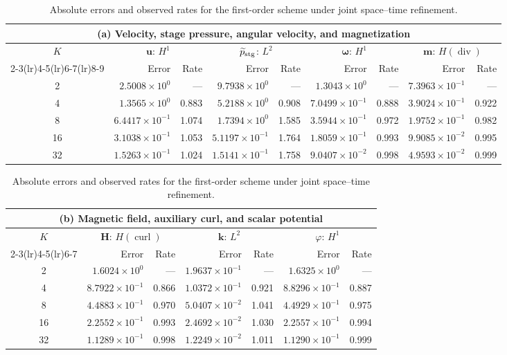 \documentclass[11pt,a4paper]{article}
\newcommand{\bs}{\boldsymbol}
\DeclareMathOperator{\curl}{curl}
\DeclareMathOperator{\ddiv}{div}
\newcommand{\Div}{\ddiv}
\newcommand{\pp}{\widetilde p}
\theoremstyle{definition}
\numberwithin{equation}{section}
\begin{document}
\begin{table}[H]
\centering
\caption{Absolute errors and observed rates for the first-order scheme under joint space--time refinement.}
\label{tab:first-order-absolute-errors}
\begingroup
\small
\setlength{\tabcolsep}{3.5pt}
\renewcommand{\arraystretch}{1.10}
\begin{tabular}{@{}c*{8}{r}@{}}
\toprule
\multicolumn{9}{c}{(a) Velocity, stage pressure, angular velocity, and magnetization}\\
\midrule
$K$ & \multicolumn{2}{c}{$\bs u$: $H^1$} & \multicolumn{2}{c}{$\pp_{\rm stg}$: $L^2$} & \multicolumn{2}{c}{$\bs\omega$: $H^1$} & \multicolumn{2}{c}{$\bs m$: $H(\Div)$}\\
\cmidrule(lr){2-3}\cmidrule(lr){4-5}\cmidrule(lr){6-7}\cmidrule(lr){8-9}
 & Error & Rate & Error & Rate & Error & Rate & Error & Rate\\
\midrule
2 & $2.5008\!\times\!10^{0}$ & --- & $9.7938\!\times\!10^{0}$ & --- & $1.3043\!\times\!10^{0}$ & --- & $7.3963\!\times\!10^{-1}$ & ---\\
4 & $1.3565\!\times\!10^{0}$ & 0.883 & $5.2188\!\times\!10^{0}$ & 0.908 & $7.0499\!\times\!10^{-1}$ & 0.888 & $3.9024\!\times\!10^{-1}$ & 0.922\\
8 & $6.4417\!\times\!10^{-1}$ & 1.074 & $1.7394\!\times\!10^{0}$ & 1.585 & $3.5944\!\times\!10^{-1}$ & 0.972 & $1.9752\!\times\!10^{-1}$ & 0.982\\
16 & $3.1038\!\times\!10^{-1}$ & 1.053 & $5.1197\!\times\!10^{-1}$ & 1.764 & $1.8059\!\times\!10^{-1}$ & 0.993 & $9.9085\!\times\!10^{-2}$ & 0.995\\
32 & $1.5263\!\times\!10^{-1}$ & 1.024 & $1.5141\!\times\!10^{-1}$ & 1.758 & $9.0407\!\times\!10^{-2}$ & 0.998 & $4.9593\!\times\!10^{-2}$ & 0.999\\
\bottomrule
\end{tabular}
\par\medskip
\begin{tabular}{@{}c*{6}{r}@{}}
\toprule
\multicolumn{7}{c}{(b) Magnetic field, auxiliary curl, and scalar potential}\\
\midrule
$K$ & \multicolumn{2}{c}{$\bs H$: $H(\curl)$} & \multicolumn{2}{c}{$\bs k$: $L^2$} & \multicolumn{2}{c}{$\varphi$: $H^1$}\\
\cmidrule(lr){2-3}\cmidrule(lr){4-5}\cmidrule(lr){6-7}
 & Error & Rate & Error & Rate & Error & Rate\\
\midrule
2 & $1.6024\!\times\!10^{0}$ & --- & $1.9637\!\times\!10^{-1}$ & --- & $1.6325\!\times\!10^{0}$ & ---\\
4 & $8.7922\!\times\!10^{-1}$ & 0.866 & $1.0372\!\times\!10^{-1}$ & 0.921 & $8.8296\!\times\!10^{-1}$ & 0.887\\
8 & $4.4883\!\times\!10^{-1}$ & 0.970 & $5.0407\!\times\!10^{-2}$ & 1.041 & $4.4929\!\times\!10^{-1}$ & 0.975\\
16 & $2.2552\!\times\!10^{-1}$ & 0.993 & $2.4692\!\times\!10^{-2}$ & 1.030 & $2.2557\!\times\!10^{-1}$ & 0.994\\
32 & $1.1289\!\times\!10^{-1}$ & 0.998 & $1.2249\!\times\!10^{-2}$ & 1.011 & $1.1290\!\times\!10^{-1}$ & 0.999\\
\bottomrule
\end{tabular}
\endgroup
\end{table}
\end{document}
